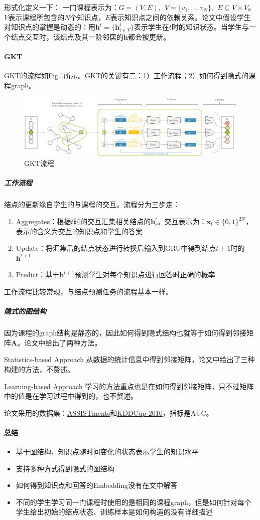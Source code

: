 形式化定义一下：
一门课程表示为：$G = (V, E),\:\: V=\{v_1, ..., v_N\},\:\: E \subseteq V\times V$。$V$表示课程所包含的$N$个知识点，$E$表示知识点之间的依赖关系。论文中假设学生对知识点的掌握是动态的：用$\boldsymbol{h}^t = \{\boldsymbol{h}^t_{i \in V}\}$表示学生在$t$时的知识状态。当学生与一个结点交互时，该结点及其一阶邻居的$\boldsymbol{h}$都会被更新。



\paragraph{GKT}
GKT的流程如Fig.\ref{fig:gkt}所示。GKT的关键有二：1）工作流程；2）如何得到隐式的课程graph。
\begin{figure}[h]
	\centering
	\includegraphics[width=.9\textwidth]{pics/gkt.png}
	\caption{GKT流程}
	\label{fig:gkt}
\end{figure}

\subparagraph{工作流程}结点的更新缘自学生的与课程的交互。流程分为三步走：
\begin{enumerate}
	\item Aggregates：根据$t$时的交互汇集相关结点的$\boldsymbol{h}^t_{i}$。交互表示为：$\boldsymbol{x}_t \in \{0, 1\}^{2N}$，表示的含义为交互的知识点和学生的答案
	\item Update：将汇集后的结点状态进行转换后输入到GRU中得到结点$t+1$时的$\boldsymbol{h}^{t+1}$
	\item Predict：基于$\boldsymbol{h}^{t+1}$预测学生对每个知识点进行回答时正确的概率
\end{enumerate}
工作流程比较常规，与结点预测任务的流程基本一样。

\subparagraph{隐式的图结构}因为课程的graph结构是静态的，因此如何得到隐式结构也就等于如何得到邻接矩阵$\boldsymbol{A}$。论文中给出了两种方法。
\par{Statistics-based Approach} 从数据的统计信息中得到邻接矩阵，论文中给出了三种构建的方法，不赘述。
\par{Learning-based Approach} 学习的方法重点也是在如何得到邻接矩阵，只不过矩阵中的值是在学习过程中得到的，也不赘述。

论文采用的数据集：\href{https://sites.google.com/site/assistmentsdata/home/assistment-2009-2010-data/skill-builder-data-2009-2010}{ASSISTments}和\href{https://pslcdatashop.web.cmu.edu/KDDCup/}{KDDCup-2010}，指标是AUC。

\paragraph{总结}

\begin{itemize}
	\item 基于图结构、知识点随时间变化的状态表示学生的知识水平
	\item 支持多种方式得到隐式的图结构
	\item 如何得到知识点和回答的Embedding没有在文中解答
	\item 不同的学生学习同一门课程时使用的是相同的课程graph，但是如何针对每个学生给出初始的结点状态、训练样本是如何构造的没有详细描述
\end{itemize}

